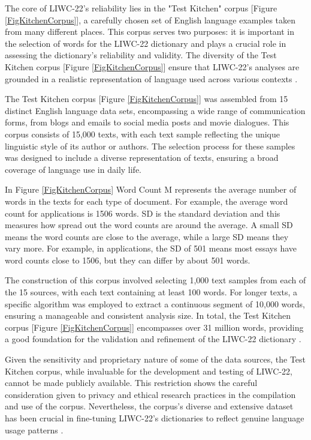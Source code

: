 The core of LIWC-22's reliability lies in the "Test Kitchen" corpus [Figure \ref{FigKitchenCorpus}], a carefully chosen set of English language examples taken from many different places. This corpus serves two purposes: it is important in the selection of words for the LIWC-22 dictionary and plays a crucial role in assessing the dictionary's reliability and validity. The diversity of the Test Kitchen corpus [Figure \ref{FigKitchenCorpus}] ensure that LIWC-22's analyses are grounded in a realistic representation of language used across various contexts \cite{boyd2022development}.

The Test Kitchen corpus [Figure \ref{FigKitchenCorpus}] was assembled from 15 distinct English language data sets, encompassing a wide range of communication forms, from blogs and emails to social media posts and movie dialogues. This corpus consists of 15,000 texts, with each text sample reflecting the unique linguistic style of its author or authors. The selection process for these samples was designed to include a diverse representation of texts, ensuring a broad coverage of language use in daily life. 

In Figure \ref{FigKitchenCorpus} Word Count M represents the average number of words in the texts for each type of document. For example, the average word count for applications is 1506 words. SD is the standard deviation and this measures how spread out the word counts are around the average. A small SD means the word counts are close to the average, while a large SD means they vary more. For example, in applications, the SD of 501 means most essays have word counts close to 1506, but they can differ by about 501 words.

The construction of this corpus involved selecting 1,000 text samples from each of the 15 sources, with each text containing at least 100 words. For longer texts, a specific algorithm was employed to extract a continuous segment of 10,000 words, ensuring a manageable and consistent analysis size. In total, the Test Kitchen corpus [Figure \ref{FigKitchenCorpus}] encompasses over 31 million words, providing a good foundation for the validation and refinement of the LIWC-22 dictionary \cite{boyd2022development}.

Given the sensitivity and proprietary nature of some of the data sources, the Test Kitchen corpus, while invaluable for the development and testing of LIWC-22, cannot be made publicly available. This restriction shows the careful consideration given to privacy and ethical research practices in the compilation and use of the corpus. Nevertheless, the corpus's diverse and extensive dataset has been crucial in fine-tuning LIWC-22's dictionaries to reflect genuine language usage patterns .

